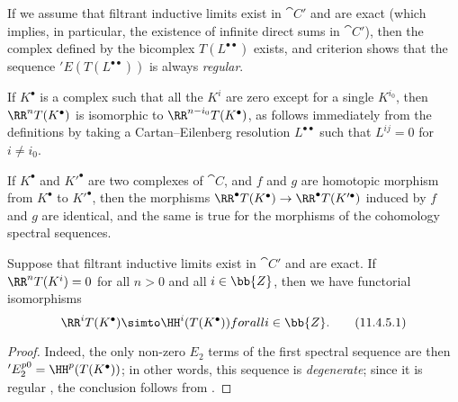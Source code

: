\begin{env}[11.4.3]
If we assume that filtrant inductive limits exist in $\cat{C}'$ and are exact (which implies, in particular, the existence of infinite direct sums in $\cat{C}'$), then the complex defined by the bicomplex $T(L^{\bullet\bullet})$ exists, and criterion  shows that the sequence $'E(T(L^{\bullet\bullet}))$ is always \emph{regular}.

If $K^\bullet$ is a complex such that all the $K^i$ are zero except for a single $K^{i_0}$, then
$\RR^n T(K^\bullet)$ is isomorphic to $\RR^{n-i_0} T(K^\bullet)$, as follows immediately from the definitions by taking a Cartan--Eilenberg resolution $L^{\bullet\bullet}$ such that $L^{ij}=0$ for $i\neq i_0$.

If $K^\bullet$ and $K'^\bullet$ are two complexes of $\cat{C}$, and $f$ and $g$ are homotopic morphism from $K^\bullet$ to $K'^\bullet$, then the morphisms $\RR^\bullet T(K^\bullet) \rightarrow \RR^\bullet T(K'^\bullet)$ induced by $f$ and $g$ are identical, and the same is true for the morphisms of the cohomology spectral sequences.
\end{env}

\begin{proposition}[11.4.5]
\label{0.11.4.5}
Suppose that filtrant inductive limits exist in $\cat{C}'$ and are exact.
If $\RR^n T(K^i) = 0$ for all $n>0$ and all $i\in\bb{Z}$, then we have functorial isomorphisms
\[
\label{0.11.4.5.1}
  \RR^i T(K^\bullet) \simto \HH^i(T(K^\bullet))
for all i\in\bb{Z}.
\tag{11.4.5.1}
\]
\end{proposition}

\begin{proof}
Indeed, the only non-zero $E_2$ terms of the first spectral sequence  are then $'E_2^{p0} = \HH^p(T(K^\bullet))$;
in other words, this sequence is \emph{degenerate};
since it is regular , the conclusion follows from .
\end{proof}


